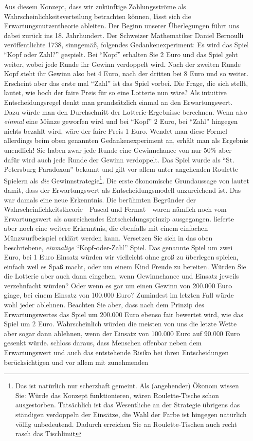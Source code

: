 Aus diesem Konzept, dass wir zukünftige Zahlungsströme als Wahrscheinlichkeitsverteilung betrachten können, lässt sich die Erwartungsnutzentheorie ableiten. Der Beginn unserer Überlegungen führt uns dabei zurück ins 18. Jahrhundert. Der Schweizer Mathematiker Daniel Bernoulli veröffentlichte 1738, sinngemäß, folgendes Gedankenexperiment: Es wird das Spiel "`Kopf oder Zahl?"' gespielt. Bei "`Kopf"' erhalten Sie 2 Euro und das Spiel geht weiter, wobei jede Runde ihr Gewinn verdoppelt wird. Nach der zweiten Runde Kopf steht ihr Gewinn also bei 4 Euro, nach der dritten bei 8 Euro und so weiter. Erscheint aber das erste mal "`Zahl"' ist das Spiel vorbei. Die Frage, die sich \textcite{Bernoulli1738} stellt, lautet, wie hoch der faire Preis für so eine Lotterie nun wäre? Als intuitive Entscheidungsregel denkt man grundsätzlich einmal an den Erwartungswert. Dazu würde man den Durchschnitt der Lotterie-Ergebnisse berechnen. Wenn also \textit{einmal} eine Münze geworfen wird und bei "`Kopf"' 2 Euro, bei "`Zahl"' hingegen nichts bezahlt wird, wäre der faire Preis 1 Euro. Wendet man diese Formel allerdings beim oben genannten Gedankenexperiment an, erhält man als Ergebnis unendlich! Sie haben zwar jede Runde eine Gewinnchance von nur 50\% aber dafür wird auch jede Runde der Gewinn verdoppelt. Das Spiel wurde als "`St. Petersburg Paradoxon"' bekannt und gilt vor allem unter angehenden Roulette-Spielern als \textit{die} Gewinnstrategie\footnote{Das ist natürlich nur scherzhaft gemeint. Als (angehender) Ökonom wissen Sie: Würde das Konzept funktionieren, wären Roulette-Tische schon ausgestorben. Tatsächlich ist das Wesentliche an der Strategie übrigens das ständigen verdoppeln der Einsätze, die Wahl der Farbe ist hingegen natürlich völlig unbedeutend. Dadurch erreichen Sie an Roulette-Tischen auch recht rasch das Tischlimit}. Die erste ökonomische Grundaussage von \textcite{Bernoulli1738} lautet damit, dass der Erwartungswert als Entscheidungsmodell unzureichend ist. Das war damals eine neue Erkenntnis. Die berühmten Begründer der Wahrscheinlichkeitstheorie - Pascal und Fermat - waren nämlich noch vom Erwartungswert als ausreichendes Entscheidungsprinzip ausgegangen. \textcite{Bernoulli1738} lieferte aber noch eine weitere Erkenntnis, die ebenfalls mit einem einfachen Münzwurfbeispiel erklärt werden kann. Versetzen Sie sich in das oben beschriebene, \textit{einmalige} "`Kopf-oder-Zahl"' Spiel. Das genannte Spiel um zwei Euro, bei 1 Euro Einsatz würden wir vielleicht ohne groß zu überlegen spielen, einfach weil es Spaß macht, oder um einem Kind  Freude zu bereiten. Würden Sie die Lotterie aber auch dann eingehen, wenn Gewinnchance und Einsatz jeweils verzehnfacht würden? Oder wenn es gar um einen Gewinn von 200.000 Euro ginge, bei einem Einsatz von 100.000 Euro? Zumindest im letzten Fall würde wohl jeder ablehnen. Beachten Sie aber, dass nach dem Prinzip des Erwartungswertes das Spiel um 200.000 Euro ebenso fair bewertet wird, wie das Spiel um 2 Euro. Wahrscheinlich würden die meisten von uns die letzte Wette aber sogar dann ablehnen, wenn der Einsatz von 100.000 Euro auf 90.000 Euro gesenkt würde. \textcite{Bernoulli1738} schloss daraus, dass Menschen offenbar neben dem Erwartungswert und auch das entstehende Risiko bei ihren Entscheidungen berücksichtigen und vor allem mit zunehmenden 